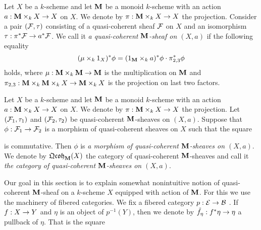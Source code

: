 \begin{definition}
Let $X$ be a $k$-scheme and let $\mathbf{M}$ be a monoid $k$-scheme with an action $a:\mathbf{M}\times_kX\rightarrow X$ on $X$. We denote by $\pi:\mathbf{M}\times_kX\rightarrow X$ the projection. Consider a pair $({\mathcal F},\tau)$ consisting of a quasi-coherent sheaf ${\mathcal F}$ on $X$ and an isomorphism $\tau:\pi^*{\mathcal F} \rightarrow a^* {\mathcal F}$. We call it \textit{a quasi-coherent $\mathbf{M}$-sheaf on $(X,a)$} if the following equality
$$(\mu\times_k1_X)^*\phi = (1_{\mathbf{M}} \times_k a)^*\phi \cdot \pi_{2,3}^*\phi$$
holds, where $\mu: \mathbf{M} \times_k \mathbf{M} \rightarrow \mathbf{M}$ is the multiplication on $\mathbf{M}$ and $\pi_{2,3}:\mathbf{M}\times_k \mathbf{M} \times_k X \rightarrow \mathbf{M} \times_kX$ is the projection on last two factors.
\end{definition}

\begin{definition}
Let $X$ be a $k$-scheme and let $\mathbf{M}$ be a monoid $k$-scheme with an action $a:\mathbf{M}\times_kX\rightarrow X$ on $X$. We denote by $\pi:\mathbf{M}\times_kX\rightarrow X$ the projection. Let $({\mathcal F}_1,\tau_1)$ and $({\mathcal F}_2,\tau_2)$ be quasi-coherent $\mathbf{M}$-sheaves on $(X,a)$. Suppose that $\phi:{\mathcal F}_1\rightarrow {\mathcal F}_2$ is a morphism of quasi-coherent sheaves on $X$ such that the square
\begin{center}
\end{center}
is commutative. Then $\phi$ is \textit{a morphism of quasi-coherent $\mathbf{M}$-sheaves on $(X,a)$}. We denote by $\mathfrak{Qcoh}_{\mathbf{M}}(X)$ the category of quasi-coherent $\mathbf{M}$-sheaves and call it \textit{the category of quasi-coherent $\mathbf{M}$-sheaves on $(X,a)$}.
\end{definition}
\noindent
Our goal in this section is to explain somewhat nonintuitive notion of quasi-coherent $\mathbf{M}$-sheaf on a $k$-scheme $X$ equipped with action of $\mathbf{M}$. For this we use the machinery of fibered categories. We fix a fibered category $p:{\mathcal E} \rightarrow {\mathcal B}$ . If $f:X\rightarrow Y$ and $\eta$ is an object of $p^{-1}(Y)$, then we denote by $\tilde{f}_{\eta}:f^*\eta\rightarrow \eta$ a pullback of $\eta$. That is the square

